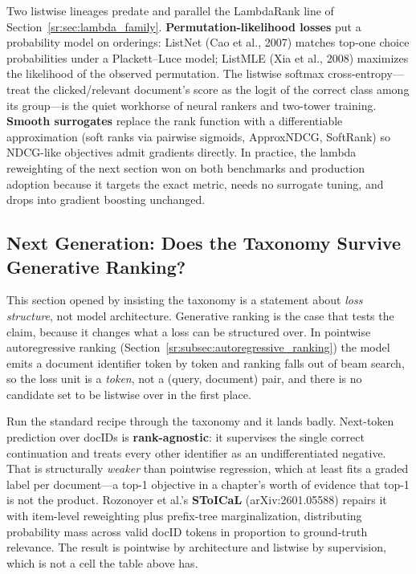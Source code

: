 Two listwise lineages predate and parallel the LambdaRank line of Section~\ref{sr:sec:lambda_family}. \textbf{Permutation-likelihood losses} put a probability model on orderings: ListNet (Cao et al., 2007) matches top-one choice probabilities under a Plackett--Luce model; ListMLE (Xia et al., 2008) maximizes the likelihood of the observed permutation. The listwise softmax cross-entropy---treat the clicked/relevant document's score as the logit of the correct class among its group---is the quiet workhorse of neural rankers and two-tower training. \textbf{Smooth surrogates} replace the rank function with a differentiable approximation (soft ranks via pairwise sigmoids, ApproxNDCG, SoftRank) so NDCG-like objectives admit gradients directly. In practice, the lambda reweighting of the next section won on both benchmarks and production adoption because it targets the exact metric, needs no surrogate tuning, and drops into gradient boosting unchanged.

\subsection{Next Generation: Does the Taxonomy Survive Generative Ranking?}
\label{sr:subsec:ltr_generative}

This section opened by insisting the taxonomy is a statement about \textit{loss structure}, not model architecture. Generative ranking is the case that tests the claim, because it changes what a loss can be structured over. In pointwise autoregressive ranking (Section~\ref{sr:subsec:autoregressive_ranking}) the model emits a document identifier token by token and ranking falls out of beam search, so the loss unit is a \textit{token}, not a (query, document) pair, and there is no candidate set to be listwise over in the first place.

Run the standard recipe through the taxonomy and it lands badly. Next-token prediction over docIDs is \textbf{rank-agnostic}: it supervises the single correct continuation and treats every other identifier as an undifferentiated negative. That is structurally \textit{weaker} than pointwise regression, which at least fits a graded label per document---a top-1 objective in a chapter's worth of evidence that top-1 is not the product. Rozonoyer et al.'s \textbf{SToICaL} (arXiv:2601.05588) repairs it with item-level reweighting plus prefix-tree marginalization, distributing probability mass across valid docID tokens in proportion to ground-truth relevance. The result is pointwise by architecture and listwise by supervision, which is not a cell the table above has.

